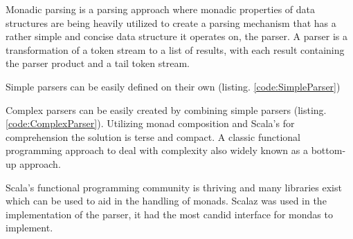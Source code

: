 \documentclass{VUMIFPSbakalaurinis}
\begin{document}
Monadic parsing is a parsing approach where monadic properties of data structures are being heavily utilized to create a parsing mechanism that has a rather simple and concise data structure it operates on, the parser.
A parser is a transformation of a token stream to a list of results, with each result containing the parser product and a tail token stream.

Simple parsers can be easily defined on their own (listing. \ref{code:SimpleParser})


\noindent
\begin{minipage}{.45\textwidth}
  
\end{minipage}\hfill
\begin{minipage}{.45\textwidth}
  
\end{minipage}

Complex parsers can be easily created by combining simple parsers (listing. \ref{code:ComplexParser}).
Utilizing monad composition and Scala's for comprehension the solution is terse and compact.
A classic functional programming approach to deal with complexity also widely known as a bottom-up approach.

Scala's functional programming community is thriving and many libraries exist which can be used to aid in the handling of monads.
Scalaz \cite{scalaz} was used in the implementation of the parser, it had the most candid interface for mondas to implement.



\end{document}
